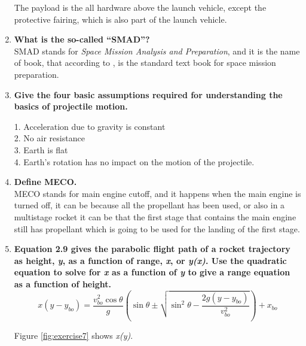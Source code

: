 \begin{enumerate}
The payload is the all hardware above the launch vehicle, except the protective fairing, which is also part of the launch vehicle. 
	
	\item {\bf What is the so-called “SMAD”?}\\
	
SMAD stands for \textit{Space Mission Analysis and Preparation}, and it is the name of book, that according to \cite{book}, is the standard text book for space mission preparation.
	
	\item {\bf Give the four basic assumptions required for understanding the basics of projectile motion.}\\
	
\begin{enumerate}
1. Acceleration due to gravity is constant\\
2. No air resistance\\
3. Earth is flat\\
4. Earth’s rotation has no impact on the motion of the projectile.
\end{enumerate}
	
	\item {\bf Define MECO.}\\
	
MECO stands for main engine cutoff, and it happens when the main engine is turned off, it can be because all the propellant has been used, or also in a multistage rocket it can be that the first stage that contains the main engine still has propellant which is going to be used for the landing of the first stage.
	
	\item {\bf Equation 2.9 gives the parabolic flight path of a rocket trajectory as height, \textit{y}, as a function of range, \textit{x}, or \textit{y(x)}. Use the quadratic equation to solve for \textit{x} as a function of \textit{y} to give a range equation as a function of height.}\\

\begin{equation} \label{eq:x_of_y}
	x(y-y_{bo})  = \frac{v_{bo}^2 \cos\theta}{g}(\sin\theta \pm \sqrt{\sin^2\theta-\frac{2g(y-y_{bo})}{v_{bo}^2}})+ x_{bo} 
\end{equation}

Figure \ref{fig:exercise7} shows \textit{x(y)}.
	

\end{enumerate}
